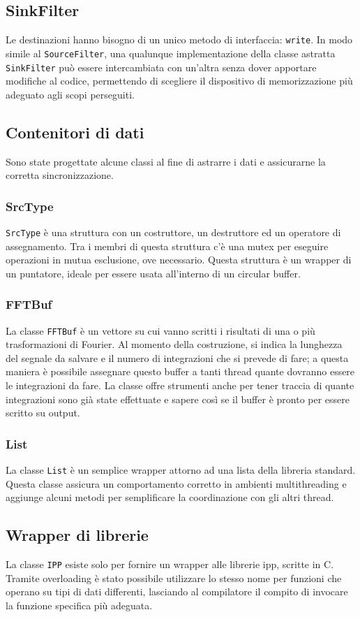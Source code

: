 \subsection{SinkFilter}
Le destinazioni hanno bisogno di un unico metodo di interfaccia: \texttt{write}.
In modo simile al \texttt{SourceFilter}, una qualunque implementazione della
classe astratta \texttt{SinkFilter} pu\`o essere intercambiata con un'altra
senza dover apportare modifiche al codice, permettendo di scegliere il
dispositivo di memorizzazione pi\`u adeguato agli scopi perseguiti.
\subsection{Contenitori di dati}
Sono state progettate alcune classi al fine di astrarre i dati e assicurarne la
corretta sincronizzazione.
\subsubsection{SrcType}
\texttt{SrcType} \`e una struttura con un costruttore, un destruttore ed un
operatore di assegnamento. Tra i membri di questa struttura c'\`e una mutex per
eseguire operazioni in mutua esclusione, ove necessario. Questa struttura \`e un
wrapper di un puntatore, ideale per essere usata all'interno di un circular
buffer.
\subsubsection{FFTBuf} La classe \texttt{FFTBuf} \`e un vettore su cui
vanno scritti i risultati di una o pi\`u trasformazioni di Fourier. Al momento
della costruzione, si indica la lunghezza del segnale da salvare e il numero di
integrazioni che si prevede di fare; a questa maniera \`e possibile assegnare
questo buffer a tanti thread quante dovranno essere le integrazioni da fare. La
classe offre strumenti anche per tener traccia di quante integrazioni sono già
state effettuate e sapere cos\`i se il buffer \`e pronto per essere scritto su
output.
\subsubsection{List}
La classe \texttt{List} \`e un semplice wrapper attorno ad una lista della
libreria standard. Questa classe assicura un comportamento corretto in ambienti
multithreading e aggiunge alcuni metodi per semplificare la coordinazione con
gli altri thread.

\subsection{Wrapper di librerie}
La classe \texttt{IPP} esiste solo per fornire un wrapper \CC alle librerie
\ac{ipp}, scritte in C. Tramite overloading \`e stato possibile utilizzare lo
stesso nome per funzioni che operano su tipi di dati differenti, lasciando al
compilatore il compito di invocare la funzione specifica pi\`u adeguata.

